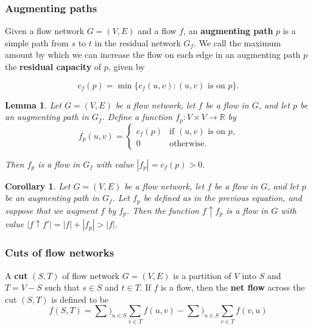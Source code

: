 \documentclass[12pt]{article}
\newtheorem{lemma}[theorem]{Lemma}
\newtheorem{corollary}[theorem]{Corollary}
\begin{document}
\subsubsection*{Augmenting paths}

Given a flow network $G = (V,E)$ and a flow $f$, an \textbf{augmenting path} $p$ is a simple path from $s$ to $t$ in the residual network $G_f$. We call the maximum amount by which we can increase the flow on each edge in an augmenting path $p$ the \textbf{residual capacity} of $p$, given by

\begin{equation*}
  c_f(p) = \min \{ c_f(u,v): (u,v) \text{ is on } p \}.
\end{equation*}

\begin{lemma}
  Let $G = (V,E)$ be a flow network, let $f$ be a flow in $G$, and let $p$ be an augmenting path in $G_f$. Define a function $f_p : V \times V \rightarrow \mathbb{R}$ by
\begin{equation*}
  f_p(u,v) =
  \begin{cases}
    c_f(p) & \text{if $(u,v)$ is on $p$,} \\
    0 & \text{otherwise.}
  \end{cases}
\end{equation*}

Then $f_p$ is a flow in $G_f$ with value $|f_p| = c_f(p) > 0$.
\end{lemma}

\begin{corollary}
  Let $G = (V, E)$ be a flow network, let $f$ be a flow in $G$, and let $p$ be an augmenting path in $G_f$. Let $f_p$ be defined as in the previous equation, and suppose that we augment $f$ by $f_p$. Then the function $f \uparrow f_p$ is a flow in $G$ with value $|f \uparrow f'| = |f| + |f_p| > |f|$.
\end{corollary}

\subsubsection*{Cuts of flow networks}

A \textbf{cut} $(S,T)$ of flow network $G = (V,E)$ is a partition of $V$ into $S$ and $T = V - S$ such that $s \in S$ and $t \in T$. If $f$ is a flow, then the \textbf{net flow} across the cut $(S,T)$ is defined to be
\begin{equation*}
  f(S,T) = \sum)_{u \in S} \sum_{v \in T} f(u,v) - \sum)_{u \in S} \sum_{v \in T} f(v,u)
\end{equation*}
\end{document}
